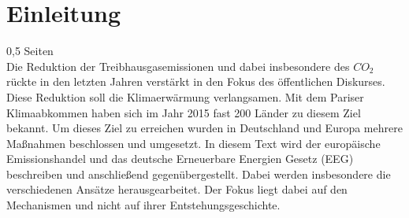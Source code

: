 \chapter{Einleitung}
0,5 Seiten\\
Die Reduktion der Treibhausgasemissionen und dabei insbesondere des $CO_2$ rückte in den letzten Jahren verstärkt in den Fokus des öffentlichen Diskurses.
Diese Reduktion soll die Klimaerwärmung verlangsamen.
Mit dem Pariser Klimaabkommen haben sich im Jahr 2015 fast 200 Länder zu diesem Ziel bekannt.
Um dieses Ziel zu erreichen wurden in Deutschland und Europa mehrere Maßnahmen beschlossen und umgesetzt.
In diesem Text wird der europäische Emissionshandel und das deutsche Erneuerbare Energien Gesetz (EEG) beschreiben und anschließend gegenübergestellt. 
Dabei werden insbesondere die verschiedenen Ansätze herausgearbeitet.
Der Fokus liegt dabei auf den Mechanismen und nicht auf ihrer Entstehungsgeschichte.